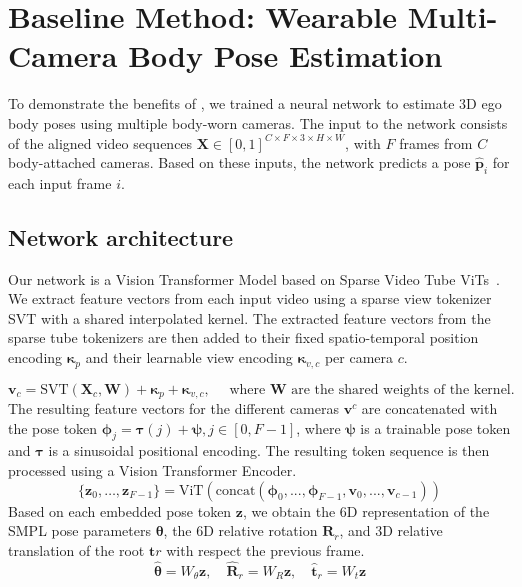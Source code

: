 \section{Baseline Method: Wearable Multi-Camera Body Pose Estimation}\label{sec:method}

\label{sec:pose_estimation}
To demonstrate the benefits of \dataset{}, we trained a neural network to estimate 3D ego body poses using multiple body-worn cameras. The input to the network consists of the aligned video sequences \( \bm{X} \in [0,1]^{C \times F \times 3 \times H \times W} \), with \( F \) frames from \( C \) body-attached cameras. Based on these inputs, the network predicts a pose \( \bm{\hat{p}}_i \) for each input frame $i$.

\subsection{Network architecture}
Our network is a Vision Transformer Model based on Sparse Video Tube ViTs~\cite{piergiovanni2023rethinking}.
We extract feature vectors from each input video using a sparse view tokenizer SVT with a shared interpolated kernel.
The extracted feature vectors from the sparse tube tokenizers are then added to their fixed spatio-temporal position encoding \( \bm{\kappa}_{p} \) and their learnable view encoding \( \bm{\kappa}_{v,c} \) per camera $c$.

\begin{equation}
    \bm{v}_{c} = \mathrm{SVT}(\bm{X}_c, \bm{W}) + \bm{\kappa}_{p} + \bm{\kappa}_{v,c}, \quad \text{ where } \bm{W} \text{ are the shared weights of the kernel.}
\end{equation}
The resulting feature vectors for the different cameras $\bm{v}^c$ are concatenated with the pose token $\bm{\phi}_{j} = \bm{\tau}(j) + \bm{\psi}, j \in[0, F-1]$, where $\bm{\psi}$ is a trainable pose token and $\bm{\tau}$ is a sinusoidal positional encoding.
The resulting token sequence is then processed using a Vision Transformer Encoder.
\begin{equation}
    \{\bm{z}_{0}, \ldots, \bm{z}_{F-1}\} = \mathrm{ViT}(\text{concat}(\bm{\phi}_0, ..., \bm{\phi}_{F-1}, \bm{v}_{0}, ..., \bm{v}_{c-1}))
\end{equation}
Based on each embedded pose token $\bm{z}$, we obtain the 6D representation \cite{zhouContinuityRotationRepresentations2019jun} of the SMPL pose parameters $\bm{\theta}$, the 6D relative rotation $\bm{R}_{r}$, and 3D relative translation of the root $\bm{t}{r}$ with respect the previous frame.
\begin{equation}
\hat{\bm{\theta}} = W_{\theta}\bm{z}, \quad \hat{\bm{R}}_r = W_{R}\bm{z}, \quad  \hat{\bm{t}}_{r} = W_{t}\bm{z}
\end{equation}

